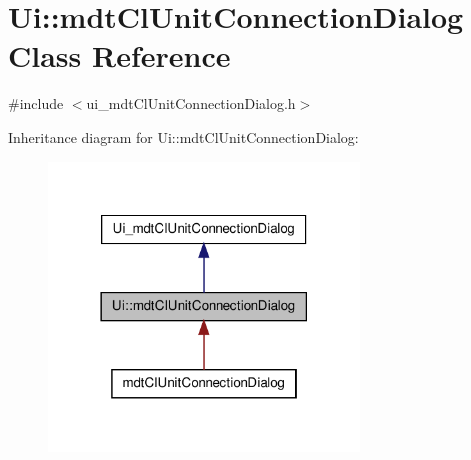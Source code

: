 \hypertarget{class_ui_1_1mdt_cl_unit_connection_dialog}{\section{Ui\-:\-:mdt\-Cl\-Unit\-Connection\-Dialog Class Reference}
\label{class_ui_1_1mdt_cl_unit_connection_dialog}
}


{\ttfamily \#include $<$ui\-\_\-mdt\-Cl\-Unit\-Connection\-Dialog.\-h$>$}



Inheritance diagram for Ui\-:\-:mdt\-Cl\-Unit\-Connection\-Dialog\-:
\nopagebreak
\begin{figure}[H]
\begin{center}
\leavevmode
\includegraphics[width=234pt]{class_ui_1_1mdt_cl_unit_connection_dialog__inherit__graph}
\end{center}
\end{figure}


